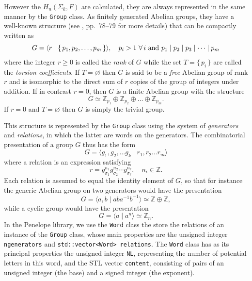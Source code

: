 \documentclass[12pt,letterpaper]{report}
\begin{document}
However the $H_n(\Sigma_k,F)$ are calculated, they are always represented in the same manner by  
the \texttt{Group} class. As finitely generated Abelian groups, they have a well-known structure (see 
\cite{Hungerford}, pp.\ 78--79 for more details) that can be compactly written as 
\begin{equation}
G = \langle r \mid \{\, p_1,p_2,\dots,p_m \,\} \rangle, \quad p_i > 1 \,\, \forall \, i \textnormal{ and } 
p_1\mid p_2 \mid p_3 \mid \dotsb \mid p_m
\end{equation}
where the integer $r \ge 0$ is called the \emph{rank} of $G$ while the set $T = \{\, p_i \,\}$ are called the 
\emph{torsion coefficients}. If $T=\varnothing$ then $G$ is said to be a \emph{free} Abelian group 
of rank $r$ and is isomorphic to the direct sum of $r$ copies of the group of integers under addition. 
If in contrast $r=0$, then $G$ is a finite Abelian group with the structure 
\begin{equation*}
G \simeq \mathbb{Z}_{p_1} \oplus \mathbb{Z}_{p_2} \oplus \dots \oplus \mathbb{Z}_{p_m}. 
\end{equation*}
If $r = 0$ and $T = \varnothing$ then $G$ is simply the trivial group. 

This structure is represented by the \texttt{Group} class using the system of \emph{generators} and 
\emph{relations}, in which the latter are words on the generators. The combinatorial presentation 
of a group $G$ thus has the form
\begin{equation}
G = \langle g_1,g_2,\dots g_k \mid r_1,r_2\dots r_m \rangle
\end{equation} 
where a relation is an expression satisfying
\begin{equation}
r = g_{\sigma_1}^{n_1} g_{\sigma_2}^{n_2} \dotsb g_{\sigma_\ell}^{n_\ell}, \quad n_i \in \mathbb{Z}.
\end{equation}
Each relation is assumed to equal the identity element of $G$, so that for instance the generic Abelian group on 
two generators would have the presentation 
\begin{equation*}
G = \langle a,b \mid aba^{-1}b^{-1} \rangle \simeq \mathbb{Z} \oplus \mathbb{Z},
\end{equation*}
while a cyclic group would have the presentation
\begin{equation*}
G = \langle a \mid a^n \rangle \simeq \mathbb{Z}_n. 
\end{equation*} 
In the Penelope library, we use the \texttt{Word} class the store the relations of an instance of the \texttt{Group} 
class, whose main properties are the unsigned integer \texttt{ngenerators} and \texttt{std::vector<Word> relations}. 
The \texttt{Word} class has as its principal properties the unsigned integer \texttt{NL}, representing the 
number of potential letters in this word, and the STL vector \texttt{content}, consisting of pairs of an 
unsigned integer (the base) and a signed integer (the exponent).
\end{document}
